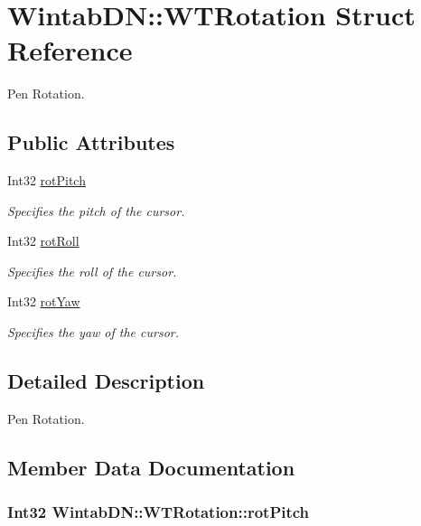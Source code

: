 \hypertarget{struct_wintab_d_n_1_1_w_t_rotation}{
\section{WintabDN::WTRotation Struct Reference}
\label{struct_wintab_d_n_1_1_w_t_rotation}
}


Pen Rotation.  


\subsection*{Public Attributes}
\begin{DoxyCompactItemize}
\item 
Int32 \hyperlink{struct_wintab_d_n_1_1_w_t_rotation_adf52078b27785a5bcaf3f7b1ae1ebd09}{rotPitch}
\begin{DoxyCompactList}\small\item\em Specifies the pitch of the cursor. \item\end{DoxyCompactList}\item 
Int32 \hyperlink{struct_wintab_d_n_1_1_w_t_rotation_a4d9c8754968c56887219363857ab8afb}{rotRoll}
\begin{DoxyCompactList}\small\item\em Specifies the roll of the cursor. \item\end{DoxyCompactList}\item 
Int32 \hyperlink{struct_wintab_d_n_1_1_w_t_rotation_a4798ee04e0f69f0038ac76c04002b350}{rotYaw}
\begin{DoxyCompactList}\small\item\em Specifies the yaw of the cursor. \item\end{DoxyCompactList}\end{DoxyCompactItemize}


\subsection{Detailed Description}
Pen Rotation. 

\subsection{Member Data Documentation}
\hypertarget{struct_wintab_d_n_1_1_w_t_rotation_adf52078b27785a5bcaf3f7b1ae1ebd09}{
\subsubsection[{rotPitch}]{\setlength{\rightskip}{0pt plus 5cm}Int32 {\bf WintabDN::WTRotation::rotPitch}}}
\label{struct_wintab_d_n_1_1_w_t_rotation_adf52078b27785a5bcaf3f7b1ae1ebd09}


